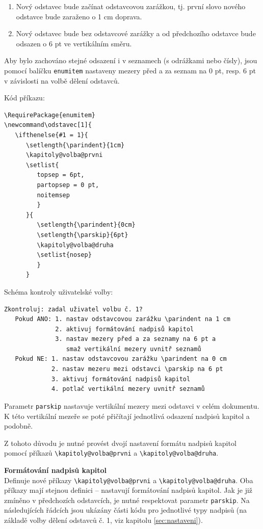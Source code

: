 \begin{enumerate}
	\item Nový odstavec bude začínat odstavcovou zarážkou, tj. první slovo nového odstavce bude zaraženo o 1 cm doprava.
	\item Nový odstavec bude bez odstavcové zarážky a od předchozího odstavce bude odsazen o 6 pt ve vertikálním směru.
\end{enumerate}

Aby bylo zachováno stejné odsazení i v seznamech (s odrážkami nebo čísly), jsou pomocí balíčku \verb|enumitem| nastaveny mezery před a za seznam na 0 pt, resp. 6 pt v závislosti na volbě dělení odstavců.

Kód příkazu:

\begin{verbatim}
\RequirePackage{enumitem}
\newcommand\odstavec[1]{
   \ifthenelse{#1 = 1}{
      \setlength{\parindent}{1cm}
      \kapitoly@volba@prvni
      \setlist{
         topsep = 6pt,
         partopsep = 0 pt,
         noitemsep
         }
      }{
         \setlength{\parindent}{0cm}
         \setlength{\parskip}{6pt}
         \kapitoly@volba@druha
         \setlist{nosep}
         }
      }
\end{verbatim}

Schéma kontroly uživatelské volby:

\begin{verbatim}
Zkontroluj: zadal uživatel volbu č. 1?
   Pokud ANO: 1. nastav odstavcovou zarážku \parindent na 1 cm
              2. aktivuj formátování nadpisů kapitol
              3. nastav mezery před a za seznamy na 6 pt a
                 smaž vertikální mezery uvnitř seznamů
   Pokud NE: 1. nastav odstavcovou zarážku \parindent na 0 cm
             2. nastav mezeru mezi odstavci \parskip na 6 pt
             3. aktivuj formátování nadpisů kapitol
             4. potlač vertikální mezery uvnitř seznamů
\end{verbatim}

Parametr \verb|parskip| nastavuje vertikální mezery mezi odstavci v celém dokumentu. K této vertikální mezeře se poté přičítají jednotlivá odsazení nadpisů kapitol a podobně.

Z tohoto důvodu je nutné provést dvojí nastavení formátu nadpisů kapitol pomocí příkazů \verb|\kapitoly@volba@prvni| a \verb|\kapitoly@volba@druha|.

\vspace{8pt}
\textbf{Formátování nadpisů kapitol}\\
Definuje nové příkazy \verb|\kapitoly@volba@prvni| a \verb|\kapitoly@volba@druha|. Oba příkazy mají stejnou definici -- nastavují formátování nadpisů kapitol. Jak je již zmíněno v předchozích odstavcích, je nutné respektovat parametr \verb|parskip|. Na následujících řádcích jsou ukázány části kódu pro jednotlivé typy nadpisů (na základě volby dělení odstavců č. 1, viz kapitolu \ref{sec:nastaveni}).

